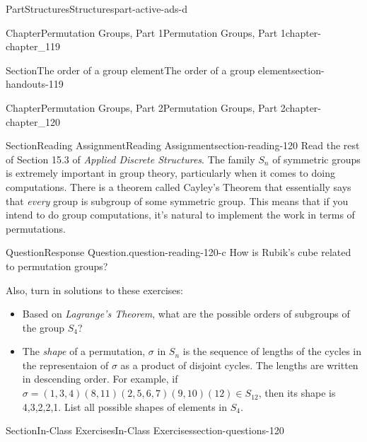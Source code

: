 \documentclass[oneside,10pt,]{book}
\numberwithin{equation}{section}
\begin{document}
\begin{partptx}{Part}{Structures}{}{Structures}{}{}{part-active-ads-d}
\begin{chapterptx}{Chapter}{Permutation Groups, Part 1}{}{Permutation Groups, Part 1}{}{}{chapter-chapter_119}
\begin{sectionptx}{Section}{The order of a group element}{}{The order of a group element}{}{}{section-handouts-119}
\end{sectionptx}
\end{chapterptx}
%
\typeout{************************************************}
\typeout{************************************************}
%
\begin{chapterptx}{Chapter}{Permutation Groups, Part 2}{}{Permutation Groups, Part 2}{}{}{chapter-chapter_120}
\renewcommand*{\chaptername}{Chapter}
\index{}%
%
%
\typeout{************************************************}
\typeout{************************************************}
%
\begin{sectionptx}{Section}{Reading Assignment}{}{Reading Assignment}{}{}{section-reading-120}
Read the rest of  Section 15.3 of \emph{Applied Discrete Structures}. The family \(S_n\) of symmetric groups is extremely important in group theory, particularly when it comes to doing computations.   There is a theorem called Cayley's Theorem that essentially says that \emph{every} group is  subgroup of some symmetric group.  This means that if you intend to do group computations, it's natural to implement the work in terms of permutations.%
\begin{question}{Question}{Response Question.}{question-reading-120-c}%
How is Rubik's cube related to permutation groups?%
\end{question}
Also, turn in solutions to these exercises:%
\begin{itemize}[label=\textbullet]
\item{}Based on \emph{Lagrange's Theorem}, what are the possible orders of subgroups of the group \(S_4\)?%
\item{}The \emph{shape} of a permutation, \(\sigma\) in \(S_n\) is the sequence of lengths of the cycles in the representaion of \(\sigma\) as a product of disjoint cycles. The lengths are written in descending order.  For example, if \(\sigma = (1,3,4)(8,11)(2,5,6,7)(9,10)(12) \in S_{12}\), then its shape is  4,3,2,2,1.  List all possible shapes of elements in \(S_4\).%
\end{itemize}
%
\end{sectionptx}
%
%
\typeout{************************************************}
\typeout{************************************************}
%
\begin{sectionptx}{Section}{In-Class Exercises}{}{In-Class Exercises}{}{}{section-questions-120}
%
\begin{enumerate}[label=\arabic*.]

\end{enumerate}
\end{sectionptx}
\end{chapterptx}
\end{partptx}
\end{document}

